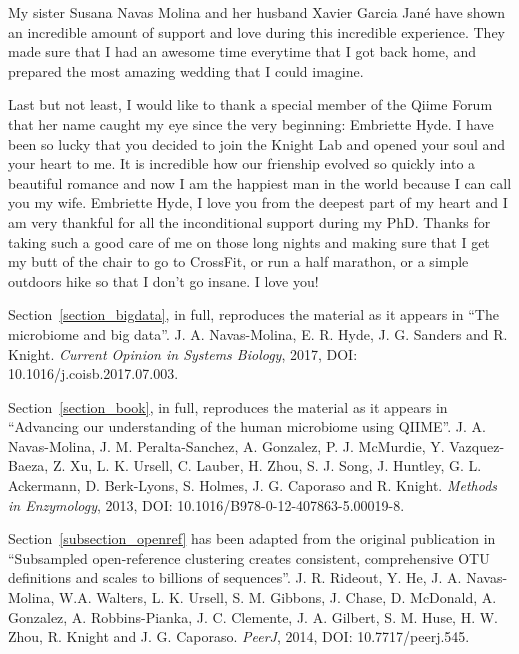 \begin{frontmatter}
\begin{acknowledgements}
    My sister Susana Navas Molina and her husband Xavier Garcia Jan\'e have shown
    an incredible amount of support and love during this incredible experience.
    They made sure that I had an awesome time everytime that I got back home, and
    prepared the most amazing wedding that I could imagine.

    Last but not least, I would like to thank a special member of the Qiime
    Forum that her name caught my eye since the very beginning: Embriette Hyde.
    I have been so lucky that you decided to join the Knight Lab and opened your
    soul and your heart to me. It is incredible how our frienship evolved so quickly
    into a beautiful romance and now I am the happiest man in the world because I can
    call you my wife. Embriette Hyde, I love you from the deepest part of my heart
    and I am very thankful for all the inconditional support during my PhD. Thanks
    for taking such a good care of me on those long nights and making sure that I get
    my butt of the chair to go to CrossFit, or run a half marathon, or a simple
    outdoors hike so that I don't go insane. I love you!

    Section~\ref{section_bigdata}, in full, reproduces the material as it
    appears in ``The microbiome and big data''. J. A. Navas-Molina, E. R. Hyde,
    J. G. Sanders and R. Knight. \emph{Current Opinion in Systems Biology},
    2017, DOI: 10.1016/j.coisb.2017.07.003.

	Section~\ref{section_book}, in full, reproduces the material as it
    appears in ``Advancing our understanding of the human microbiome using QIIME''.
	J. A. Navas-Molina, J. M. Peralta-Sanchez, A. Gonzalez, P. J. McMurdie,
	Y. Vazquez-Baeza, Z. Xu, L. K. Ursell, C. Lauber, H. Zhou, S. J. Song,
	J. Huntley, G. L. Ackermann, D. Berk-Lyons, S. Holmes, J. G. Caporaso and R.
	Knight. \emph{Methods in Enzymology}, 2013, DOI: 10.1016/B978-0-12-407863-5.00019-8.

    Section~\ref{subsection_openref} has been adapted from the original publication in
    ``Subsampled open-reference clustering creates consistent, comprehensive OTU
    definitions and scales to billions of sequences''. J. R. Rideout, Y. He,
    J. A. Navas-Molina, W.A. Walters, L. K. Ursell, S. M. Gibbons, J. Chase,
    D. McDonald, A. Gonzalez, A. Robbins-Pianka, J. C. Clemente, J. A. Gilbert,
    S. M. Huse, H. W. Zhou, R. Knight and J. G. Caporaso. \emph{PeerJ}, 2014, DOI: 10.7717/peerj.545.


\end{acknowledgements}
\end{frontmatter}
